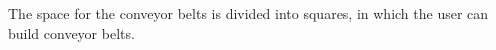 The space for the conveyor belts is divided into squares, in which the user can build conveyor belts.